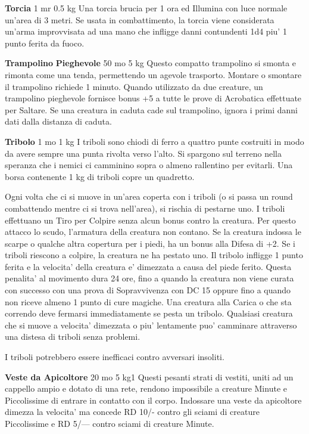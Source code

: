 \documentclass[a4paper,11pt,twoside,openany]{book}
\begin{document}
{\textbf{Torcia} 1 mr 0.5 kg Una torcia brucia per 1 ora ed Illumina con luce normale un'area di 3 metri. Se usata in combattimento, la torcia viene considerata un'arma improvvisata ad una mano che infligge danni contundenti 1d4 piu' 1 punto ferita da fuoco. 

\textbf{Trampolino} \textbf{Pieghevole} 50 mo 5 kg Questo compatto trampolino si smonta e rimonta come una tenda, permettendo un agevole trasporto. Montare o smontare il trampolino richiede 1 minuto. Quando utilizzato da due creature, un trampolino pieghevole fornisce bonus +5 a tutte le prove di Acrobatica effettuate per Saltare. Se una creatura in caduta cade sul trampolino, ignora i primi danni dati dalla distanza di caduta.

\textbf{Tribolo} 1 mo 1 kg I triboli sono chiodi di ferro a quattro punte costruiti in modo da avere sempre una punta rivolta verso l'alto. Si spargono sul terreno nella speranza che i nemici ci camminino sopra o almeno rallentino per evitarli. Una borsa contenente 1 kg di triboli copre un quadretto.

Ogni volta che ci si muove in un'area coperta con i triboli (o si passa un round combattendo mentre ci si trova nell'area), si rischia di pestarne uno. I triboli effettuano un Tiro per Colpire senza alcun bonus contro la creatura. Per questo attacco lo scudo, l'armatura della creatura non contano. Se la creatura indossa le scarpe o qualche altra copertura per i piedi, ha un bonus alla Difesa di +2. Se i triboli riescono a colpire, la creatura ne ha pestato uno. Il tribolo infligge 1 punto ferita e la velocita' della creatura e' dimezzata a causa del piede ferito. Questa penalita' al movimento dura 24 ore, fino a quando la creatura non viene curata con successo con una prova di Sopravvivenza con DC 15 oppure fino a quando non riceve almeno 1 punto di cure magiche.
Una creatura alla Carica o che sta correndo deve fermarsi immediatamente se pesta un tribolo. Qualsiasi creatura che si muove a velocita' dimezzata o piu' lentamente puo' camminare attraverso una distesa di triboli senza problemi.

I triboli potrebbero essere inefficaci contro avversari insoliti.

\textbf{Veste da Apicoltore} 20 mo 5 kg1 Questi pesanti strati di vestiti, uniti ad un cappello ampio e dotato di una rete, rendono impossibile a creature Minute e Piccolissime di entrare in contatto con il corpo. Indossare una veste da apicoltore dimezza la velocita' ma concede RD 10/- contro gli sciami di creature Piccolissime e RD 5/--- contro sciami di creature Minute.

}
\end{document}
